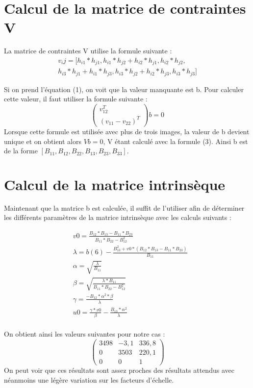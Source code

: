 \documentclass[a4paper,10pt]{article}
\begin{document}
\section{Calcul de la matrice de contraintes V}
La matrice de contraintes V utilise la formule suivante :
\begin{multline}
 v_ij = [h_{i1}*h_{j1}, h_{i1}*h_{j2} + h_{i2}*h_{j1}, h_{i2}*h_{j2},  \\
 h_{i3}*h_{j1} + h_{i1}*h_{j3}, h_{i3}*h_{j2} + h_{i2}*h_{j3}, h_{i3}*h_{j3}]
\end{multline}

Si on prend l'équation (1), on voit que la valeur manquante est b. Pour calculer cette valeur, il faut
utiliser la formule suivante :
\begin{equation}
 \begin{pmatrix}v^T_{12}\\(v_{11}-v_{22})^T\end{pmatrix}b=0
\end{equation}
Lorsque cette formule est utilisée avec plus de trois images, la valeur de b devient unique et on obtient
alors $Vb=0$, V étant calculé avec la formule (3). Ainsi b est de la forme $[B_{11}, B_{12}, B_{22}, B_{13}, B_{23}, B_{33}]$.

\section{Calcul de la matrice intrinsèque}
Maintenant que la matrice b est calculée, il suffit de l'utiliser afin de déterminer les différents 
paramètres de la matrice intrinsèque avec les calculs suivants : 

\begin{align}
  &v0     = \frac{B_{12}*B_{13} - B_{11}*B_{23}}{B_{11}*B_{22} - B^2_{12}}\\
  &\lambda = b(6) - \frac{B^2_{13} + v0 * (B_{12} * B_{13} - B_{11} * B_{23})}{B_{11}}\\
  &\alpha  = \sqrt{\frac{\lambda}{B_{11}}}\\
  &\beta   = \sqrt{\frac{\lambda*B_{11}}{B_{11}*B_{22} - B^2_{12}}}\\
  &\gamma  = \frac{-B_{12}*\alpha^2*\beta}{\lambda}\\
  &u0     = \frac{\gamma *v0}{\beta} - \frac{B_{13}*\alpha^2}{\lambda}\\
\end{align}

On obtient ainsi les valeurs suivantes pour notre cas : 
$$\begin{pmatrix} 3498 & -3,1 & 336,8\\0 & 3503 & 220,1\\ 0 & 0 & 1\end{pmatrix}$$
On peut voir que ces résultats sont assez proches des résultats attendus avec néanmoins
une légère variation sur les facteurs d'échelle.
\end{document}
